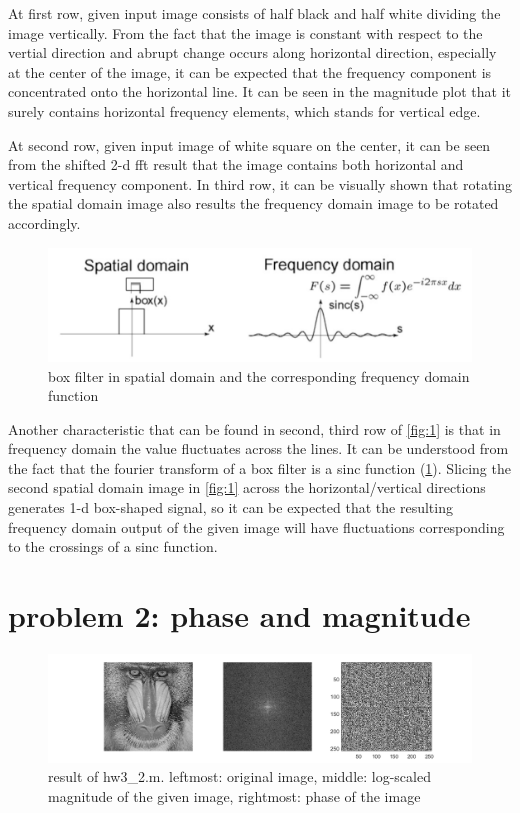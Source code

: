 \documentclass[extendedabs]{bmvc2k}
\begin{document}
At first row, given input image consists of half black and half white dividing the image vertically.
From the fact that the image is constant with respect to the vertial direction and abrupt change occurs
along horizontal direction, especially at the center of the image, it can be expected that the frequency
component is concentrated onto the horizontal line. It can be seen in the magnitude plot that it surely
contains horizontal frequency elements, which stands for vertical edge.

At second row, given input image of white square on the center, it can be seen from
the shifted 2-d fft result that the image contains both horizontal and vertical frequency
component. In third row, it can be visually shown that rotating the spatial domain image also
results the frequency domain image to be rotated accordingly.

\begin{figure}[h]
    \centering
    \includegraphics[width=\linewidth]{hw3_1_2}
    \caption{box filter in spatial domain and the corresponding frequency domain function}
    \label{fig:8}
\end{figure}

Another characteristic that can be found in second, third row of \figurename{\ref{fig:1}} is 
that in frequency domain the value fluctuates across the lines. It can be understood from the fact 
that the fourier transform of a box filter is a sinc function (\figurename{\ref{fig:8}}). 
Slicing the second spatial domain image in \figurename{\ref{fig:1}}
across the horizontal/vertical directions generates 1-d box-shaped signal, so it can be expected that 
the resulting frequency domain output of the given image will have fluctuations corresponding to the crossings
of a sinc function. 

\section*{problem 2: phase and magnitude}

\begin{figure}[h]
    \centering
    \includegraphics[width=\linewidth]{hw3_2_1}
    \caption{result of hw3\_2.m. leftmost: original image, middle: log-scaled magnitude
    of the given image, rightmost: phase of the image}
    \label{fig:2}
\end{figure}
\end{document}

